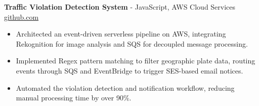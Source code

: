 \documentclass[11pt]{article}       %
\begin{document}

\textbf{Traffic Violation Detection System}{ - JavaScript, AWS Cloud Services} \hfill \href{https://github.com/Monica20030707/AWS_rekonigition-N-read-database}{github.com} \\
\vspace{-9pt}
\begin{itemize}
  \item Architected an event-driven serverless pipeline on AWS, integrating Rekognition for image analysis and SQS for decoupled message processing.
  \item Implemented Regex pattern matching to filter geographic plate data, routing events through SQS and EventBridge to trigger SES-based email notices.
  \item Automated the violation detection and notification workflow, reducing manual processing time by over 90\%.
\end{itemize}

\end{document}
